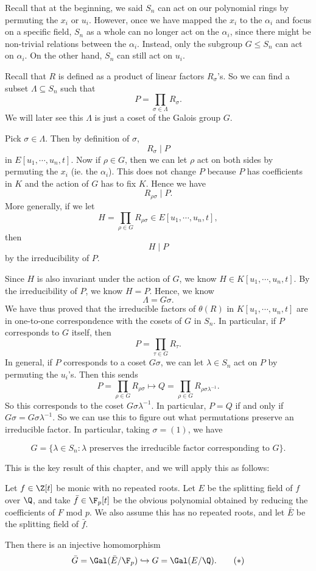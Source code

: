 \documentclass[a4paper]{article}
\begin{document}
Recall that at the beginning, we said $S_n$ can act on our polynomial rings by permuting the $x_i$ or $u_i$. However, once we have mapped the $x_i$ to the $\alpha_i$ and focus on a specific field, $S_n$ as a whole can no longer act on the $\alpha_i$, since there might be non-trivial relations between the $\alpha_i$. Instead, only the subgroup $G \leq S_n$ can act on $\alpha_i$. On the other hand, $S_n$ can still act on $u_i$.

Recall that $R$ is defined as a product of linear factors $R_\sigma$'s. So we can find a subset $\Lambda \subseteq S_n$ such that
\[
  P = \prod_{\sigma \in \Lambda} R_\sigma.
\]
We will later see this $\Lambda$ is just a coset of the Galois group $G$.

Pick $\sigma \in \Lambda$. Then by definition of $\sigma$,
\[
  R_\sigma \mid P
\]
in $E[u_1, \cdots, u_n, t]$. Now if $\rho \in G$, then we can let $\rho$ act on both sides by permuting the $x_i$ (ie. the $\alpha_i$). This does not change $P$ because $P$ has coefficients in $K$ and the action of $G$ has to fix $K$. Hence we have
\[
  R_{\rho\sigma} \mid P.
\]
More generally, if we let
\[
  H = \prod_{\rho \in G} R_{\rho \sigma} \in E[u_1, \cdots, u_n, t],
\]
then
\[
  H \mid P
\]
by the irreducibility of $P$.

Since $H$ is also invariant under the action of $G$, we know $H \in K[u_1, \cdots, u_n, t]$. By the irreducibility of $P$, we know $H = P$. Hence, we know
\[
  \Lambda = G\sigma.
\]
We have thus proved that the irreducible factors of $\theta(R)$ in $K[u_1, \cdots, u_n, t] $ are in one-to-one correspondence with the cosets of $G$ in $S_n$. In particular, if $P$ corresponds to $G$ itself, then
\[
  P = \prod_{\tau \in G} R_\tau.
\]
In general, if $P$ corresponds to a coset $G \sigma$, we can let $\lambda \in S_n$ act on $P$ by permuting the $u_i$'s. Then this sends
\[
  P = \prod_{\rho \in G} R_{\rho \sigma} \mapsto Q = \prod_{\rho \in G} R_{\rho \sigma \lambda^{-1}}.
\]
So this corresponds to the coset $G\sigma\lambda^{-1}$. In particular, $P = Q$ if and only if $G\sigma = G \sigma \lambda^{-1}$. So we can use this to figure out what permutations preserve an irreducible factor. In particular, taking $\sigma = (1)$, we have
\begin{thm}
  \[
    G = \{\lambda \in S_n : \lambda \text{ preserves the irreducible factor corresponding to }G\}.
  \]
\end{thm}
This is the key result of this chapter, and we will apply this as follows:

\begin{thm}
  Let $f \in \Z[t]$ be monic with no repeated roots. Let $E$ be the splitting field of $f$ over $\Q$, and take $\bar{f} \in \F_p[t]$ be the obvious polynomial obtained by reducing the coefficients of $F$ mod $p$. We also assume this has no repeated roots, and let $\bar{E}$ be the splitting field of $\bar{f}$.

  Then there is an injective homomorphism
  \[
    \bar{G} = \Gal(\bar{E}/\F_p) \hookrightarrow G = \Gal(E/\Q).\tag{$*$}
  \]
\end{thm}
\end{document}
